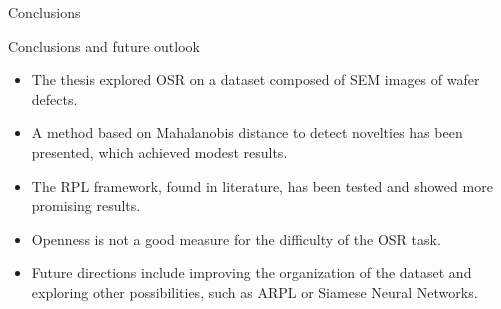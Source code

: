 \begin{frame}{Conclusions}
    \begin{normalblock}{Conclusions and future outlook}
        \begin{itemize}
        \item <1-> The thesis explored OSR on a dataset composed of SEM images of wafer defects.
        \item <2-> A method based on Mahalanobis distance to detect novelties has been presented, which achieved modest results.
        \item <3-> The RPL framework, found in literature, has been tested and showed more promising results.
        \item <4-> Openness is not a good measure for the difficulty of the OSR task.
        \item <5-> Future directions include improving the organization of the dataset and exploring other possibilities, such as ARPL or Siamese Neural Networks.
        \end{itemize}
    \end{normalblock}
\end{frame}